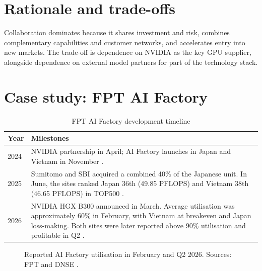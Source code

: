 \documentclass[a4paper,12pt]{report}
\begin{document}
\section{Rationale and trade-offs}

Collaboration dominates because it shares investment and risk, combines complementary capabilities and customer networks, and accelerates entry into new markets. The trade-off is dependence on NVIDIA as the key GPU supplier, alongside dependence on external model partners for part of the technology stack.

\section{Case study: FPT AI Factory}

\begin{table}[H]
\centering
\caption{FPT AI Factory development timeline}
\label{tab:ai-factory-timeline}
\renewcommand{\arraystretch}{1.15}
\begin{tabular}{p{} p{}}
\toprule
\textbf{Year} & \textbf{Milestones} \\
\midrule
2024 & NVIDIA partnership in April; AI Factory launches in Japan and Vietnam in November \cite{S5,S7}. \\
2025 & Sumitomo and SBI acquired a combined 40\% of the Japanese unit. In June, the sites ranked Japan 36th (49.85 PFLOPS) and Vietnam 38th (46.65 PFLOPS) in TOP500 \cite{S6,S10}. \\
2026 & NVIDIA HGX B300 announced in March. Average utilisation was approximately 60\% in February, with Vietnam at breakeven and Japan loss-making. Both sites were later reported above 90\% utilisation and profitable in Q2 \cite{A21,S4}. \\
\bottomrule
\end{tabular}
\end{table}

\begin{figure}[H]
\centering
{}
\caption[AI Factory utilisation]{Reported AI Factory utilisation in February and Q2 2026. Sources: FPT and DNSE \cite{S4}.}
\label{fig:ai-factory-utilisation}
\end{figure}
\end{document}
